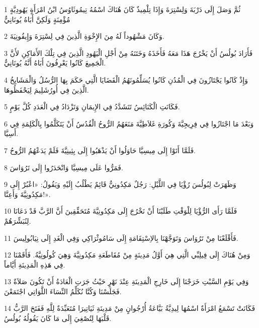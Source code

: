 \par 1 ثُمَّ وَصَلَ إِلَى دَرْبَةَ وَلِسْتِرَةَ وَإِذَا تِلْمِيذٌ كَانَ هُنَاكَ اسْمُهُ تِيمُوثَاوُسُ ابْنُ امْرَأَةٍ يَهُودِيَّةٍ مُؤْمِنَةٍ وَلَكِنَّ أَبَاهُ يُونَانِيٌّ
\par 2 وَكَانَ مَشْهُوداً لَهُ مِنَ الإِخْوَةِ الَّذِينَ فِي لِسْتِرَةَ وَإِيقُونِيَةَ.
\par 3 فَأَرَادَ بُولُسُ أَنْ يَخْرُجَ هَذَا مَعَهُ فَأَخَذَهُ وَخَتَنَهُ مِنْ أَجْلِ الْيَهُودِ الَّذِينَ فِي تِلْكَ الأَمَاكِنِ لأَنَّ الْجَمِيعَ كَانُوا يَعْرِفُونَ أَبَاهُ أَنَّهُ يُونَانِيٌّ.
\par 4 وَإِذْ كَانُوا يَجْتَازُونَ فِي الْمُدُنِ كَانُوا يُسَلِّمُونَهُمُ الْقَضَايَا الَّتِي حَكَمَ بِهَا الرُّسُلُ وَالْمَشَايِخُ الَّذِينَ فِي أُورُشَلِيمَ لِيَحْفَظُوهَا.
\par 5 فَكَانَتِ الْكَنَائِسُ تَتَشَدَّدُ فِي الإِيمَانِ وَتَزْدَادُ فِي الْعَدَدِ كُلَّ يَوْمٍ.
\par 6 وَبَعْدَ مَا اجْتَازُوا فِي فِرِيجِيَّةَ وَكُورَةِ غَلاَطِيَّةَ مَنَعَهُمُ الرُّوحُ الْقُدُسُ أَنْ يَتَكَلَّمُوا بِالْكَلِمَةِ فِي أَسِيَّا.
\par 7 فَلَمَّا أَتَوْا إِلَى مِيسِيَّا حَاوَلُوا أَنْ يَذْهَبُوا إِلَى بِثِينِيَّةَ فَلَمْ يَدَعْهُمُ الرُّوحُ.
\par 8 فَمَرُّوا عَلَى مِيسِيَّا وَانْحَدَرُوا إِلَى تَرُوَاسَ.
\par 9 وَظَهَرَتْ لِبُولُسَ رُؤْيَا فِي اللَّيْلِ: رَجُلٌ مَكِدُونِيٌّ قَائِمٌ يَطْلُبُ إِلَيْهِ وَيَقُولُ: «اعْبُرْ إِلَى مَكِدُونِيَّةَ وَأَعِنَّا!».
\par 10 فَلَمَّا رَأَى الرُّؤْيَا لِلْوَقْتِ طَلَبْنَا أَنْ نَخْرُجَ إِلَى مَكِدُونِيَّةَ مُتَحَقِّقِينَ أَنَّ الرَّبَّ قَدْ دَعَانَا لِنُبَشِّرَهُمْ.
\par 11 فَأَقْلَعْنَا مِنْ تَرُوَاسَ وَتَوَجَّهْنَا بِالاِسْتِقَامَةِ إِلَى سَامُوثْرَاكِي وَفِي الْغَدِ إِلَى نِيَابُولِيسَ.
\par 12 وَمِنْ هُنَاكَ إِلَى فِيلِبِّي الَّتِي هِيَ أَوَّلُ مَدِينَةٍ مِنْ مُقَاطَعَةِ مَكِدُونِيَّةَ وَهِيَ كُولُونِيَّةُ. فَأَقَمْنَا فِي هَذِهِ الْمَدِينَةِ أَيَّاماً.
\par 13 وَفِي يَوْمِ السَّبْتِ خَرَجْنَا إِلَى خَارِجِ الْمَدِينَةِ عِنْدَ نَهْرٍ حَيْثُ جَرَتِ الْعَادَةُ أَنْ تَكُونَ صَلاَةٌ فَجَلَسْنَا وَكُنَّا نُكَلِّمُ النِّسَاءَ اللَّوَاتِي اجْتَمَعْنَ.
\par 14 فَكَانَتْ تَسْمَعُ امْرَأَةٌ اسْمُهَا لِيدِيَّةُ بَيَّاعَةُ أُرْجُوانٍ مِنْ مَدِينَةِ ثَيَاتِيرَا مُتَعَبِّدَةٌ لِلَّهِ فَفَتَحَ الرَّبُّ قَلْبَهَا لِتُصْغِيَ إِلَى مَا كَانَ يَقُولُهُ بُولُسُ.
